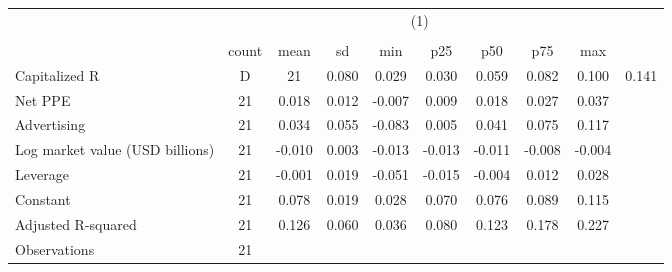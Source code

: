 {
\def\sym#1{\ifmmode^{#1}\else\(^{#1}\)\fi}
\begin{tabular}{l*{1}{cccccccc}}
\hline\hline
                    &                                                                                \\
                    &                                                                                   \\
                    &       count&        mean&          sd&         min&         p25&         p50&         p75&         max\\
\hline
Capitalized R&D     &          21&       0.080&       0.029&       0.030&       0.059&       0.082&       0.100&       0.141\\
Net PPE             &          21&       0.018&       0.012&      -0.007&       0.009&       0.018&       0.027&       0.037\\
Advertising         &          21&       0.034&       0.055&      -0.083&       0.005&       0.041&       0.075&       0.117\\
Log market value (USD billions)&          21&      -0.010&       0.003&      -0.013&      -0.013&      -0.011&      -0.008&      -0.004\\
Leverage            &          21&      -0.001&       0.019&      -0.051&      -0.015&      -0.004&       0.012&       0.028\\
Constant            &          21&       0.078&       0.019&       0.028&       0.070&       0.076&       0.089&       0.115\\
Adjusted R-squared  &          21&       0.126&       0.060&       0.036&       0.080&       0.123&       0.178&       0.227\\
\hline
Observations        &          21&            &            &            &            &            &            &            \\
\hline\hline
\end{tabular}
}
